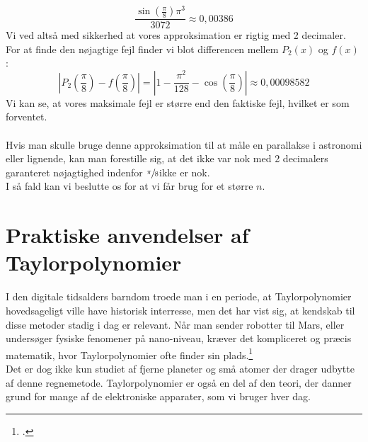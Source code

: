 \documentclass[12pt, a4paper]{article}
\begin{document}
\begin{refsection}
\begin{equation*}
    \frac{\sin\left(\frac{\pi}{8}\right)\pi^3}{3072}\approx 0{,}00386
\end{equation*}
Vi ved altså med sikkerhed at vores approksimation er rigtig med 2 decimaler.\\
For at finde den nøjagtige fejl finder vi blot differencen mellem $P_2(x)$ og $f(x)$ :
\begin{equation*}
    \left|P_2\left(\frac{\pi}{8}\right)-f\left(\frac{\pi}{8}\right)\right|=\left|1-\frac{\pi^2}{128}-\cos\left(\frac{\pi}{8} \right)   \right|\approx 0{,}00098582
\end{equation*}
Vi kan se, at vores maksimale fejl er større end den faktiske fejl, hvilket er som forventet.\\
\\
Hvis man skulle bruge denne approksimation til at måle en parallakse i astronomi eller lignende, kan man forestille sig, at det ikke var nok med 2 decimalers garanteret nøjagtighed indenfor $\sfrac{\pi}{8}$ikke er nok.\\
I så fald kan vi beslutte os for at vi får brug for et større $n$.
\section{Praktiske anvendelser af Taylorpolynomier}
I den digitale tidsalders barndom troede man i en periode, at Taylorpolynomier hovedsageligt ville have historisk interresse, men det har vist sig, at kendskab til disse metoder stadig i dag er relevant. Når man sender robotter til Mars, eller undersøger fysiske fenomener på nano-niveau, kræver det kompliceret og præcis matematik, hvor Taylorpolynomier ofte finder sin plads.\footcite[s. 11]{hvadermatematik}\\
Det er dog ikke kun studiet af fjerne planeter og små atomer der drager udbytte af denne regnemetode. Taylorpolynomier er også en del af den teori, der danner grund for mange af de elektroniske apparater, som vi bruger hver dag. 

\end{refsection}
\end{document}
